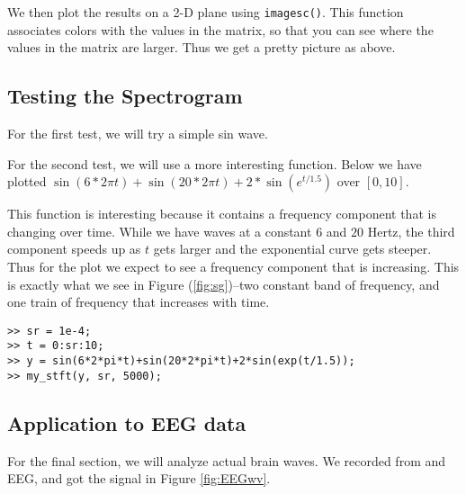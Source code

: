 \documentclass{article}
\begin{document}
We then plot the results on a 2-D plane using {\tt imagesc()}.  This function associates colors with the values in the matrix, so that you can see where the values in the matrix are larger.  Thus we get a pretty picture as above.

\subsection{Testing the Spectrogram}
For the first test, we will try a simple sin wave.  

For the second test, we will use a more interesting function.  Below we have plotted $\sin(6*2\pi t)+\sin(20*2\pi t)+2*\sin(e^{t/1.5})$ over $[0,10]$.

This function is interesting because it contains a frequency component that is changing over time.  While we have waves at a constant $6$ and $20$ Hertz, the third component speeds up as $t$ gets larger and the exponential curve gets steeper.  Thus for the plot we expect to see a frequency component that is increasing.  This is exactly what we see in Figure (\ref{fig:sg})--two constant band of frequency, and one train of frequency that increases with time.

\begin{verbatim}
>> sr = 1e-4;
>> t = 0:sr:10;
>> y = sin(6*2*pi*t)+sin(20*2*pi*t)+2*sin(exp(t/1.5));
>> my_stft(y, sr, 5000);
\end{verbatim}




\subsection{Application to EEG data}
For the final section, we will analyze actual brain waves.  We recorded from and EEG, and got the signal in Figure \ref{fig:EEGwv}.
%
\end{document}
